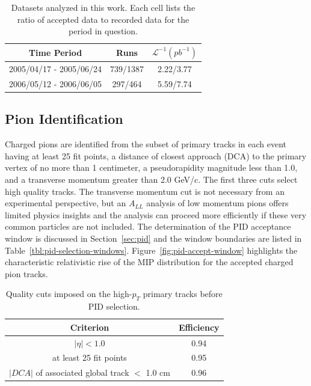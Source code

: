 \begin{table}
  \centering
  \begin{tabular}{|c|cc|}
    \hline
    Time Period & Runs & $\mathcal{L}^{-1} (pb^{-1})$ \\
    \hline
    2005/04/17 - 2005/06/24  & 739/1387 & 2.22/3.77 \\ %
    2006/05/12 - 2006/06/05  & 297/464  & 5.59/7.74 \\ %
    \hline
  \end{tabular}
  \caption{Datasets analyzed in this work.  Each cell lists the ratio of accepted data to recorded data for the period in question.}
  \label{tab:dataset-luminosities}
\end{table}

\subsection{Pion Identification}

Charged pions are identified from the subset of primary tracks in each event
having at least 25 fit points, a distance of closest approach (DCA) to the
primary vertex of no more than 1 centimeter, a pseudorapidity magnitude less
than 1.0, and a transverse momentum greater than 2.0 GeV/c. The first three cuts
select high quality tracks. The transverse momentum cut is not necessary from an
experimental perspective, but an \(A_{LL}\) analysis of low momentum pions
offers limited physics insights and the analysis can proceed more efficiently if
these very common particles are not included. The determination of the PID
acceptance window is discussed in Section~\ref{sec:pid} and the window
boundaries are listed in Table~\ref{tbl:pid-selection-windows}.
Figure~\ref{fig:pid-accept-window} highlights the characteristic relativistic
rise of the MIP distribution for the accepted charged pion tracks.

\begin{table}
  \centering
  \begin{tabular}{|c|c|}
    \hline
    Criterion & Efficiency \\
    \hline
    $|\eta| < 1.0$ & 0.94 \\
    at least 25 fit points & 0.95 \\
    $|DCA|$ of associated global track $<$ 1.0 cm & 0.96 \\
    \hline
  \end{tabular}
  \caption{Quality cuts imposed on the high-$p_T$ primary tracks before PID selection.}
\end{table}

